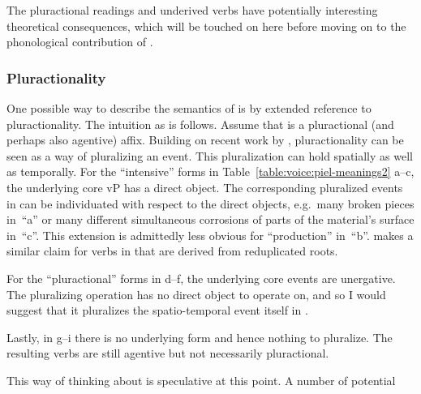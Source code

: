 \begin{exe}
\begin{xlist}
\begin{exe}
\begin{xlist}
\begin{exe}
\begin{xlist}
\begin{exe}
\begin{exe}
\begin{xlist}
\begin{exe}
\begin{xlist}
\begin{exe}
\begin{xlist}
\begin{exe}
\begin{xlist}
\begin{exe}
\begin{xlist}
\begin{exe}
\begin{xlist}
\begin{exe}
\begin{xlist}
\begin{exe}
\begin{xlist}
\begin{exe}
\begin{xlist}
\begin{exe}
\begin{xlist}
\begin{exe}
\begin{xlist}
\begin{exe}
\begin{xlist}
\begin{exe}
\begin{exe}
\begin{xlist}
\begin{exe}
\begin{xlist}
\begin{exe}
\begin{xlist}
\begin{exe}
\begin{xlist}
{\begin{exe}
\begin{xlist}
\begin{exe}
\begin{xlist}
\begin{exe}
\begin{xlist}
\begin{exe}
\begin{xlist}
\begin{xlist}
\begin{xlist}
\begin{exe}
\begin{xlist}
\begin{xlist}
\begin{xlist}
\begin{exe}
\begin{exe}
\begin{xlist}
\begin{exe}
\begin{xlist}
\begin{exe}
\begin{xlist}
\begin{exe}
\begin{xlist}
\begin{exe}
\begin{xlist}
\begin{exe}
\begin{xlist}
\begin{exe}
\begin{exe}
\begin{xlist}
\begin{xlist}
\begin{exe}
\begin{xlist}
\begin{exe}
\begin{xlist}
\begin{exe}
\begin{xlist}
\begin{exe}
\begin{xlist}
\begin{exe}
\begin{xlist}
\begin{exe}
\begin{xlist}
\begin{exe}
\begin{exe}
\begin{xlist}
\begin{exe}
\begin{xlist}
\begin{exe}
\begin{xlist}
\begin{exe}
\begin{xlist}
\begin{table}
	\label{table:voice:piel-meanings2} 
\end{table}

The pluractional readings and underived verbs have potentially interesting theoretical consequences, which will be touched on here before moving on to the phonological contribution of {\va}.

		\subsubsection{Pluractionality} \label{voice:va:sem:plural}
One possible way to describe the semantics of {\va} is by extended reference to pluractionality. The intuition as is follows. Assume that {\va} is a pluractional (and perhaps also agentive) affix. Building on recent work by \cite{henderson12phd,henderson17nllt}, pluractionality can be seen as a way of pluralizing an event. This pluralization can hold spatially as well as temporally. For the ``intensive'' forms in Table~\ref{table:voice:piel-meanings2} a--c, the underlying core vP has a direct object. The corresponding pluralized events in {\tpie} can be individuated with respect to the direct objects, e.g.~many broken pieces in~``a'' or many different simultaneous corrosions of parts of the material's surface in~``c''. This extension is admittedly less obvious for ``production'' in~``b''. \cite{greenberg10} makes a similar claim for verbs in {\tpie} that are derived from reduplicated roots.

For the ``pluractional'' forms in d--f, the underlying core events are unergative. The pluralizing operation has no direct object to operate on, and so I would suggest that it pluralizes the spatio-temporal event itself in {\tpie}.

Lastly, in g--i there is no underlying form and hence nothing to pluralize. The resulting verbs are still agentive but not necessarily pluractional.

This way of thinking about {\tpie} is speculative at this point. A number of potential 
\end{xlist}
\end{exe}
\end{xlist}
\end{exe}
\end{xlist}
\end{exe}
\end{xlist}
\end{exe}
\end{exe}
\end{xlist}
\end{exe}
\end{xlist}
\end{exe}
\end{xlist}
\end{exe}
\end{xlist}
\end{exe}
\end{xlist}
\end{exe}
\end{xlist}
\end{exe}
\end{xlist}
\end{xlist}
\end{exe}
\end{exe}
\end{xlist}
\end{exe}
\end{xlist}
\end{exe}
\end{xlist}
\end{exe}
\end{xlist}
\end{exe}
\end{xlist}
\end{exe}
\end{xlist}
\end{exe}
\end{exe}
\end{xlist}
\end{xlist}
\end{xlist}
\end{exe}
\end{xlist}
\end{xlist}
\end{xlist}
\end{exe}
\end{xlist}
\end{exe}
\end{xlist}
\end{exe}
\end{xlist}
\end{exe}}
\end{xlist}
\end{exe}
\end{xlist}
\end{exe}
\end{xlist}
\end{exe}
\end{xlist}
\end{exe}
\end{exe}
\end{xlist}
\end{exe}
\end{xlist}
\end{exe}
\end{xlist}
\end{exe}
\end{xlist}
\end{exe}
\end{xlist}
\end{exe}
\end{xlist}
\end{exe}
\end{xlist}
\end{exe}
\end{xlist}
\end{exe}
\end{xlist}
\end{exe}
\end{xlist}
\end{exe}
\end{xlist}
\end{exe}
\end{xlist}
\end{exe}
\end{exe}
\end{xlist}
\end{exe}
\end{xlist}
\end{exe}
\end{xlist}
\end{exe}

